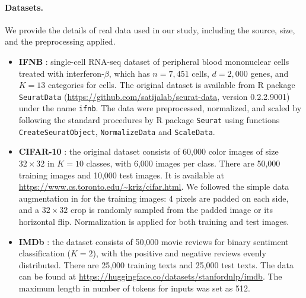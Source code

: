 \paragraph{Datasets.} We provide the details of real data used in our study, including the source, size, and the preprocessing applied.
\begin{itemize}
    \item \textbf{IFNB} \cite{ifnb}: 
    single-cell RNA-seq dataset of peripheral blood mononuclear cells treated with interferon-$\beta$, which has $n=7,451$ cells, $d=2,000$ genes, and $K=13$ categories for cells. The original dataset is available from R package \texttt{SeuratData} (\url{https://github.com/satijalab/seurat-data}, version 0.2.2.9001) under the name \texttt{ifnb}. The data were preprocessed, normalized, and scaled by following the standard procedures by R package \texttt{Seurat} using functions \texttt{CreateSeuratObject}, \texttt{NormalizeData} and \texttt{ScaleData}.
    
    \item \textbf{CIFAR-10} \cite{KrizhevskyCIFAR102009}: the original dataset consists of 60,000 color images of size $32 \times 32$ in $K=10$ classes, with 6,000 images per class. There are 50,000 training images and 10,000 test images. It is available at \url{https://www.cs.toronto.edu/~kriz/cifar.html}. We followed the simple data augmentation in \cite{resnet, cao2019learning} for the training images: 4 pixels are padded on each side, and a $32 \times 32$ crop is randomly sampled from the padded image or its horizontal flip. Normalization is applied for both training and test images.
    
    \item \textbf{IMDb} \cite{IMDB}: the dataset consists of 50,000 movie reviews for binary sentiment classification ($K=2$), with the positive and negative reviews evenly distributed. There are 25,000 training texts and 25,000 test texts. The data can be found at \url{https://huggingface.co/datasets/stanfordnlp/imdb}. The maximum length in number of tokens for inputs was set as 512.
\end{itemize}

